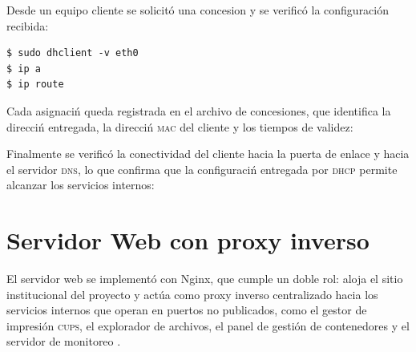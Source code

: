 Desde un equipo cliente se solicit\'o una concesion y se verific\'o la
configuraci\'on recibida:

\begin{lstlisting}[style=terminal]
$ sudo dhclient -v eth0
$ ip a
$ ip route
\end{lstlisting}


Cada asignaci\'n queda registrada en el archivo de concesiones, que
identifica la direcci\'n entregada, la direcci\'n \textsc{mac} del cliente y
los tiempos de validez:


Finalmente se verific\'o la conectividad del cliente hacia la puerta de
enlace y hacia el servidor \textsc{dns}, lo que confirma que la
configuraci\'n entregada por \textsc{dhcp} permite alcanzar los servicios
internos:


\section{Servidor Web con proxy inverso}

El servidor web se implement\'o con Nginx, que cumple un doble rol: aloja
el sitio institucional del proyecto y act\'ua como proxy inverso
centralizado hacia los servicios internos que operan en puertos no
publicados, como el gestor de impresi\'on \textsc{cups}, el explorador de
archivos, el panel de gesti\'on de contenedores y el servidor de monitoreo
\cite{nginxDocs}.

